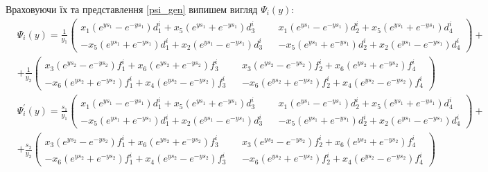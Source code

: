 Враховуючи їх та представлення \eqref{psi_gen} випишем вигляд $\Psi_i(y)$:
\begin{align*}
    &\Psi_i(y) = \frac{1}{y_1} \begin{pmatrix}
        x_1(e^{y s_1} - e^{-y s_1})d_1^i + x_5(e^{y s_1} + e^{-y s_1})d_3^i && x_1(e^{y s_1} - e^{-y s_1})d_2^i + x_5(e^{y s_1} + e^{-y s_1})d_4^i \\
        -x_5(e^{y s_1} + e^{-y s_1})d_1^i + x_2(e^{y s_1} - e^{-y s_1})d_3^i && -x_5(e^{y s_1} + e^{-y s_1})d_2^i + x_2(e^{y s_1} - e^{-y s_1})d_4^i
    \end{pmatrix} + \\
    &+ \frac{1}{y_2} \begin{pmatrix}
        x_3(e^{y s_2} - e^{-y s_2})f_1^i + x_6(e^{y s_2} + e^{-y s_2})f_3^i && x_3(e^{y s_2} - e^{-y s_2})f_2^i + x_6(e^{y s_2} + e^{-y s_2})f_4^i \\
        -x_6(e^{y s_2} + e^{-y s_2})f_1^i + x_4(e^{y s_2} - e^{-y s_2})f_3^i && -x_6(e^{y s_2} + e^{-y s_2})f_2^i + x_4(e^{y s_2} - e^{-y s_2})f_4^i
    \end{pmatrix}
\end{align*}
\begin{align*}
    &\Psi_i^{'}(y) = \frac{s_1}{y_1} \begin{pmatrix}
        x_1(e^{y s_1} - e^{-y s_1})d_1^i + x_5(e^{y s_1} + e^{-y s_1})d_3^i && x_1(e^{y s_1} - e^{-y s_1})d_2^i + x_5(e^{y s_1} + e^{-y s_1})d_4^i \\
        -x_5(e^{y s_1} + e^{-y s_1})d_1^i + x_2(e^{y s_1} - e^{-y s_1})d_3^i && -x_5(e^{y s_1} + e^{-y s_1})d_2^i + x_2(e^{y s_1} - e^{-y s_1})d_4^i
    \end{pmatrix} + \\
    &+ \frac{s_2}{y_2} \begin{pmatrix}
        x_3(e^{y s_2} - e^{-y s_2})f_1^i + x_6(e^{y s_2} + e^{-y s_2})f_3^i && x_3(e^{y s_2} - e^{-y s_2})f_2^i + x_6(e^{y s_2} + e^{-y s_2})f_4^i \\
        -x_6(e^{y s_2} + e^{-y s_2})f_1^i + x_4(e^{y s_2} - e^{-y s_2})f_3^i && -x_6(e^{y s_2} + e^{-y s_2})f_2^i + x_4(e^{y s_2} - e^{-y s_2})f_4^i
    \end{pmatrix}
\end{align*}

